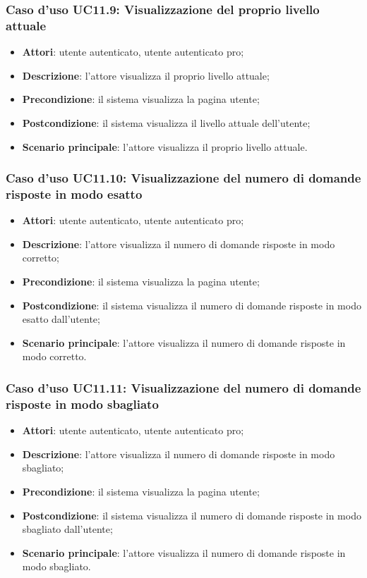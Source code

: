 \subsubsection{Caso d'uso UC11.9: Visualizzazione del proprio livello attuale }
\begin{itemize}
	\item\textbf{Attori}: utente autenticato, utente autenticato pro;
	\item\textbf{Descrizione}: l'attore visualizza il proprio livello attuale;
	\item\textbf{Precondizione}: il sistema visualizza la pagina utente;
	\item\textbf{Postcondizione}: il sistema visualizza il livello attuale dell'utente;
	\item\textbf{Scenario principale}: l'attore visualizza il proprio livello attuale.
\end{itemize}

\subsubsection{Caso d'uso UC11.10: Visualizzazione del numero di domande risposte in modo esatto}
\begin{itemize}
	\item\textbf{Attori}: utente autenticato, utente autenticato pro;
	\item\textbf{Descrizione}: l'attore visualizza il numero di domande risposte in modo corretto;
	\item\textbf{Precondizione}: il sistema visualizza la pagina utente;
	\item\textbf{Postcondizione}: il sistema visualizza il numero di domande risposte in modo esatto dall'utente;
	\item\textbf{Scenario principale}: l'attore visualizza il numero di domande risposte in modo corretto.
\end{itemize}

\subsubsection{Caso d'uso UC11.11: Visualizzazione del numero di domande risposte in modo sbagliato }
\begin{itemize}
	\item\textbf{Attori}: utente autenticato, utente autenticato pro;
	\item\textbf{Descrizione}: l'attore visualizza il numero di domande risposte in modo sbagliato;
	\item\textbf{Precondizione}: il sistema visualizza la pagina utente;
	\item\textbf{Postcondizione}: il sistema visualizza il numero di domande risposte in modo sbagliato dall'utente;
	\item\textbf{Scenario principale}: l'attore visualizza il numero di domande risposte in modo sbagliato.
\end{itemize}

